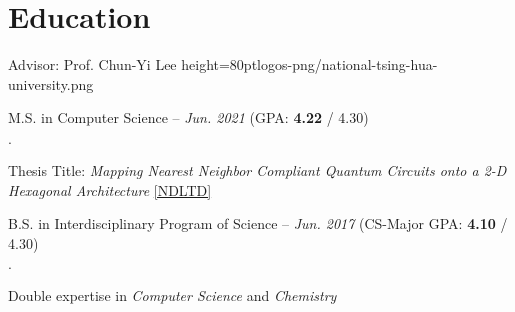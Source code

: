 \documentclass{cvclass}
\begin{document}

\section{Education}

        {Advisor: Prof. Chun-Yi Lee}
        {height=80pt}{logos-png/national-tsing-hua-university.png}{
    \item M.S. in Computer Science -- \textit{Jun. 2021} (GPA: \textbf{4.22} / 4.30)
    \begin{plainitemize}{\(\cdot\)}
        \item Thesis Title: \textit{Mapping Nearest Neighbor Compliant Quantum Circuits onto a 2-D Hexagonal Architecture} \href{https://hdl.handle.net/11296/dpttkc}{[NDLTD]}
    \end{plainitemize}
    \item B.S. in Interdisciplinary Program of Science -- \textit{Jun. 2017} (CS-Major GPA: \textbf{4.10} / 4.30)
    \begin{plainitemize}{\(\cdot\)}
        \item Double expertise in \textit{Computer Science} and \textit{Chemistry}
    \end{plainitemize}}


\makepublications
\end{document}
